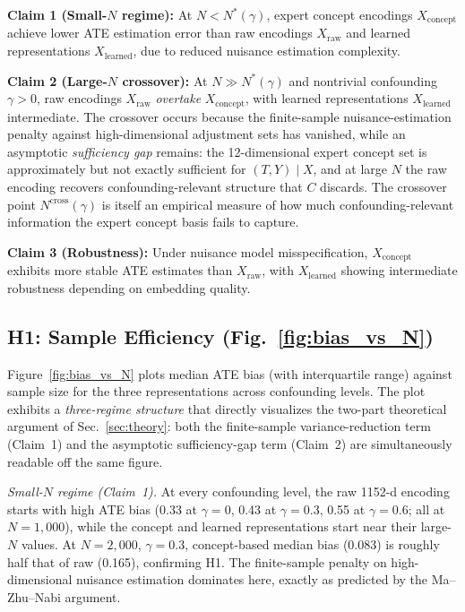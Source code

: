 \documentclass[11pt]{article}
\begin{document}
\textbf{Claim 1 (Small-$N$ regime):} At $N < N^*(\gamma)$, expert concept encodings
$X_{\text{concept}}$ achieve lower ATE estimation error than raw encodings
$X_{\text{raw}}$ and learned representations $X_{\text{learned}}$, due to reduced
nuisance estimation complexity.

\textbf{Claim 2 (Large-$N$ crossover):} At $N \gg N^*(\gamma)$ and nontrivial
confounding $\gamma > 0$, raw encodings $X_{\text{raw}}$ \emph{overtake}
$X_{\text{concept}}$, with learned representations $X_{\text{learned}}$ intermediate.
The crossover occurs because the finite-sample nuisance-estimation penalty against
high-dimensional adjustment sets has vanished, while an asymptotic \emph{sufficiency
gap} remains: the 12-dimensional expert concept set is approximately but not exactly
sufficient for $(T,Y) \mid X$, and at large $N$ the raw encoding recovers
confounding-relevant structure that $C$ discards. The crossover point
$N^{\text{cross}}(\gamma)$ is itself an empirical measure of how much
confounding-relevant information the expert concept basis fails to capture.

\textbf{Claim 3 (Robustness):} Under nuisance model misspecification,
$X_{\text{concept}}$ exhibits more stable ATE estimates than $X_{\text{raw}}$, with
$X_{\text{learned}}$ showing intermediate robustness depending on embedding quality.

\subsection*{H1: Sample Efficiency (Fig.~\ref{fig:bias_vs_N})}
Figure~\ref{fig:bias_vs_N} plots median ATE bias (with interquartile range) against
sample size for the three representations across confounding levels. The plot
exhibits a \emph{three-regime structure} that directly visualizes the two-part
theoretical argument of Sec.~\ref{sec:theory}: both the finite-sample
variance-reduction term (Claim~1) and the asymptotic sufficiency-gap term
(Claim~2) are simultaneously readable off the same figure.

\textit{Small-$N$ regime (Claim~1).} At every confounding level, the raw 1152-d
encoding starts with high ATE bias (0.33 at $\gamma{=}0$, 0.43 at $\gamma{=}0.3$,
0.55 at $\gamma{=}0.6$; all at $N{=}1{,}000$), while the concept and learned
representations start near their large-$N$ values. At $N{=}2{,}000$, $\gamma{=}0.3$,
concept-based median bias (0.083) is roughly half that of raw (0.165), confirming
H1. The finite-sample penalty on high-dimensional nuisance estimation dominates
here, exactly as predicted by the Ma--Zhu--Nabi
argument.\cite{ma2012semiparametric,nabi2022causal}
\end{document}
